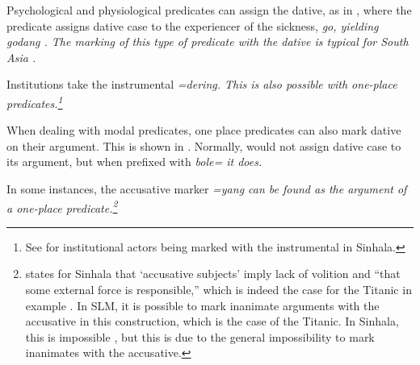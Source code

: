 Psychological and physiological predicates can assign the dative, as in , where the predicate  assigns dative case to the experiencer of the sickness, \em go\em, yielding \em godang \em \citep[cf.][]{Ansaldo2005ms,Ansaldo2008genesis, Ansaldo2009book}. The marking of this type of predicate with the dative is typical for South Asia \citep[159ff]{Masica1976}.
 

Institutions  take the instrumental \em =dering\em. This is also possible with one-place predicates.\footnote{See \citet[791]{Gair2003} for institutional actors being marked with the instrumental in Sinhala.}


When dealing with modal predicates, one place predicates can also mark dative on their argument. This is shown in . Normally,  would not assign dative case to its argument, but when prefixed with \em bole= \em it does.


In some instances, the accusative marker \em =yang \em can be found as the argument of a one-place predicate.\footnote{\citet[791]{Gair2003} states for Sinhala that `accusative subjects' imply lack of volition and ``that some external force is responsible,'' which is indeed the case for the Titanic in example . In SLM, it is possible to mark inanimate arguments with the accusative in this construction, which is the case of the Titanic. In Sinhala, this is impossible \citep[15]{Gair1991infl}, but this is due to the general impossibility to mark inanimates with the accusative.}



